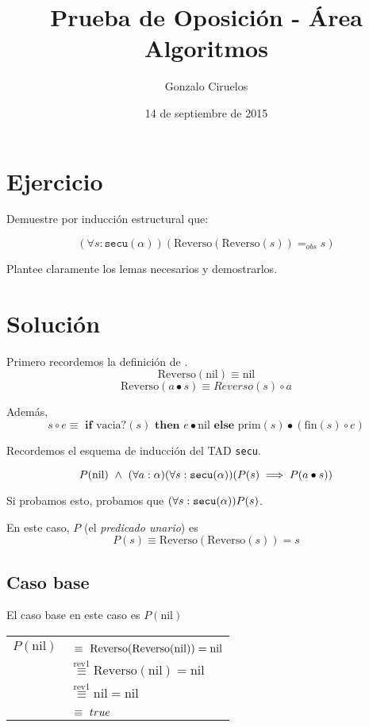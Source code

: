 \documentclass[hidelinks,a4paper,10pt, nofootinbib]{article}
\title{Prueba de Oposición - Área Algoritmos}
\author{Gonzalo Ciruelos}
\date{14 de septiembre de 2015}
\newcommand{\tx}[1]{\text{#1}}
\newcommand{\secu}{\ensuremath\texttt{secu}(\alpha)}
\newcommand{\rev}{\text{Reverso}}
\newcommand{\cons}{\bullet}
\newcommand{\snoc}{\circ}
\newcommand{\nil}{\text{nil}}
\newcommand{\prim}{\text{prim}}
\newcommand{\fin}{\text{fin}}
\newcommand{\por}[1]{\overset{\text{#1}}{\equiv}}
\begin{document}
\maketitle

\section*{Ejercicio}

Demuestre por inducción estructural que:

$$(\forall s : \texttt{secu}(\alpha))(\tx{Reverso}(\tx{Reverso}(s)) =_{obs} s)$$

Plantee claramente los lemas necesarios y demostrarlos.


\section*{Solución}

Primero recordemos la definición de \rev.
\[\rev(\nil) \equiv \nil \tag{rev1}\]
\[\rev(a \cons s) \equiv Reverso(s) \snoc a \tag{rev2}\]

Además,
\[s \circ e \equiv \textbf{ if } \text{vacia?}(s) \textbf{ then } e \cons \nil \textbf{ else } \prim(s) \cons (\fin(s) \circ e) \tag{snoc}\]

Recordemos el esquema de inducción del TAD \texttt{secu}.

$$P(\nil)\  \land \  (\forall a : \alpha) (\forall s : \secu) (P(s) \implies P(a \cons s))$$

Si probamos esto, probamos que $(\forall s : \secu) P(s)$.

En este caso, $P$  (el \emph{predicado unario}) es
$$ P(s) \equiv \rev(\rev(s)) = s$$



\subsection*{Caso base}
El caso base en este caso es $P(\nil)$

\begin{center}
\begin{tabular}{c l}
$P(\nil)$ & $\por{\phantom{rev1}} \rev(\rev(\nil)) = \nil$ \\
          & $\por{rev1} \rev(\nil) = \nil$ \\
          & $\por{rev1} \nil = \nil$  \\
          & $\por{\phantom{rev1}} true$ \\
\end{tabular}
\end{center}
\end{document}
